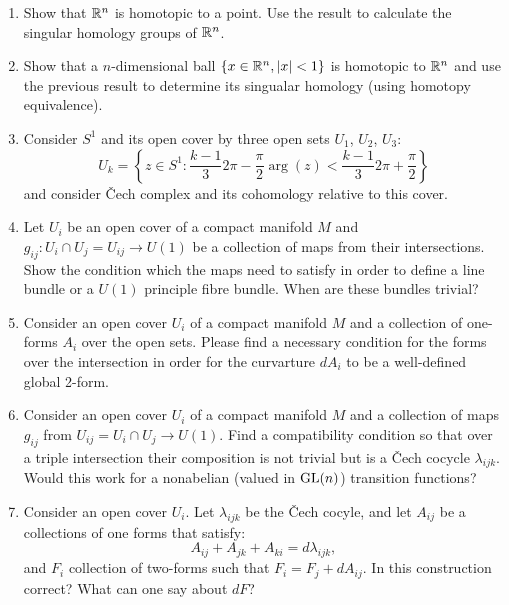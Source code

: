 \documentclass[a4paper,11pt]{article}
\begin{document}
\begin{enumerate}
\item Show that $\mathbb{R}^{ n }$ is homotopic to a point. Use the result
  to calculate the singular homology groups of $\mathbb{R}^{ n }$.

\item Show that a $n$-dimensional ball
  $\{ x \in \mathbb{R}^{ n }, \lvert{  x  }\rvert < 1 \}$ is homotopic to $\mathbb{R}^{ n }$
  and use the previous result to determine its singualar homology
  (using homotopy equivalence).

\item Consider $S^{ 1 }$ and its open cover by three open sets
  $U_{ 1 }$, $U_{ 2 }$, $U_{ 3 }$:
  \begin{equation}
    \label{DiffGeo:06}
    U_{ k } =
    \left\{ z \in S^{ 1 } : \frac{ k - 1 }{ 3 } 2\pi - \frac{ \pi }{ 2 }
      \arg( z ) < \frac{ k - 1 }{ 3 } 2\pi + \frac{ \pi }{ 2 } \right\}
  \end{equation}
  and consider \v{C}ech complex and its cohomology relative to this
  cover.

\item Let $U_{ i }$ be an open cover of a compact manifold $M$ and
  $g_{ i j } : U_{ i } \cap U_{ j } = U_{ i j } \to U( 1 )$ be a
  collection of maps from their intersections. Show the condition
  which the maps need to satisfy in order to define a line bundle or a
  $U( 1 )$ principle fibre bundle. When are these bundles trivial?

\item Consider an open cover $U_{ i }$ of a compact manifold $M$ and a
  collection of one-forms $A_{ i }$ over the open sets. Please find a
  necessary condition for the forms over the intersection in order for
  the curvarture $dA_{ i }$ to be a well-defined global 2-form.

\item Consider an open cover $U_{ i }$ of a compact manifold $M$ and a
  collection of maps $g_{ ij }$ from
  $U_{ ij } = U_{ i } \cap U_{ j } \to U( 1 )$. Find a compatibility
  condition so that over a triple intersection their composition is
  not trivial but is a \v{C}ech cocycle $\lambda_{ i j k }$. Would
  this work for a nonabelian (valued in $\mathrm{GL}( n )$) transition
  functions?

\item Consider an open cover $U_{ i }$. Let $\lambda_{ i j k }$ be the
  \v{C}ech cocyle, and let $A_{ i j }$ be a collections of one forms
  that satisfy:
  \begin{equation}
    \label{eq:DiffGeo-07}
    A_{ i j } + A_{ j k } + A_{ k i } = d\lambda_{ i j k },
  \end{equation}
  and $F_{ i }$ collection of two-forms such that
  $F_{ i } = F_{ j } + dA_{ i j }$. In this construction correct? What
  can one say about $dF$?


\end{enumerate}
\end{document}
